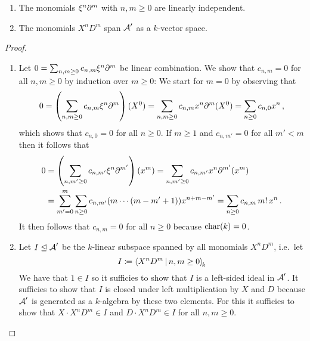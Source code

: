 \begin{lemma}
  \label{lemma: preparation for weyl basis}
  \leavevmode
  \begin{enumerate}
    \item
      The monomials $\xi^n \partial^m$ with $n, m \geq 0$ are linearly independent.
    \item
      The monomials $X^n D^m$ span $\operatorname{\mathcal{A}}'$ as a $k$-vector space.
  \end{enumerate}
\end{lemma}


\begin{proof}
  \leavevmode
  \begin{enumerate}
    \item
      Let $0 = \sum_{n, m \geq 0} c_{n,m} \xi^n \partial^m$ be linear combination.
      We show that $c_{n,m} = 0$ for all $n, m \geq 0$ by induction over $m \geq 0$:
      We start for $m = 0$ by observing that
      \[
          0
        = \left( \sum_{n, m \geq 0} c_{n,m} \xi^n \partial^m \right)(X^0)
        = \sum_{n, m \geq 0} c_{n,m} x^n \partial^m(X^0)
        = \sum_{n \geq 0} c_{n,0} x^n \,,
      \]
      which shows that $c_{n,0} = 0$ for all $n \geq 0$.
      If $m \geq 1$ and $c_{n,m'} = 0$ for all $m' < m$ then it follows that
      \begin{align*}
            0
        &=  \left( \sum_{n, m' \geq 0} c_{n,m'} \xi^n \partial^{m'} \right)(x^m)
         =  \sum_{n, m' \geq 0} c_{n,m'} x^n \partial^{m'}(x^m)
        \\
        &=  \sum_{m'=0}^m \sum_{n \geq 0} c_{n,m'} (m \dotsm (m-m'+1)) x^{n+m-m'}
         =  \sum_{n \geq 0} c_{n,m} \, m! \, x^n \,.
      \end{align*}
      It then follows that $c_{n,m} = 0$ for all $n \geq 0$ because $\operatorname{char}(k) = 0$.
    \item
      Let $I \trianglelefteq \operatorname{\mathcal{A}}'$ be the $k$-linear subspace spanned by all monomials $X^n D^m$, i.e.\ let
      \[
                  I
        \defined  \left\langle
                    X^n D^m
                  \suchthat*
                    n, m \geq 0
                  \right\rangle_{\!k}
      \]
      We have that $1 \in I$ so it sufficies to show that $I$ is a left-sided ideal in $\operatorname{\mathcal{A}}'$.
      It sufficies to show that $I$ is closed under left multiplication by $X$ and $D$ because $\operatorname{\mathcal{A}}'$ is generated as a $k$-algebra by these two elements.
      For this it sufficies to show that $X \cdot X^n D^m \in I$ and $D \cdot X^n D^m \in I$ for all $n, m \geq 0$.
      

\end{enumerate}
\end{proof}
